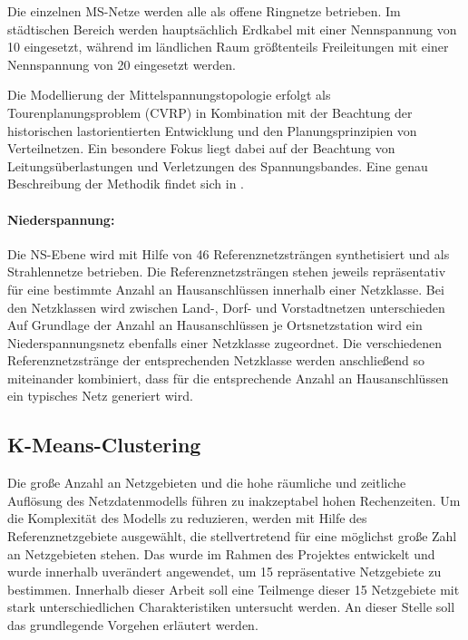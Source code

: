 Die einzelnen \gls{MS}-Netze werden alle als offene Ringnetze betrieben.
Im städtischen Bereich werden hauptsächlich Erdkabel mit einer Nennspannung von \SI{10}{\kv} eingesetzt, während im ländlichen Raum größtenteils Freileitungen mit einer Nennspannung von \SI{20}{\kv} eingesetzt werden. \cite{Mueller2019}\medskip

Die Modellierung der Mittelspannungstopologie erfolgt als Tourenplanungsproblem (\gls{CVRP}) in Kombination mit der Beachtung der historischen lastorientierten Entwicklung und den Planungsprinzipien von Verteilnetzen.
Ein besondere Fokus liegt dabei auf der Beachtung von Leitungsüberlastungen und Verletzungen des Spannungsbandes.
Eine genau Beschreibung der Methodik findet sich in \cite{Amme2018}.


\paragraph{Niederspannung:}

Die \gls{NS}-Ebene wird mit Hilfe von \num{46} Referenznetzsträngen synthetisiert und als Strahlennetze betrieben.
Die Referenznetzsträngen stehen jeweils repräsentativ für eine bestimmte Anzahl an Hausanschlüssen innerhalb einer Netzklasse.
Bei den Netzklassen wird zwischen Land-, Dorf- und Vorstadtnetzen unterschieden
Auf Grundlage der Anzahl an Hausanschlüssen je Ortsnetzstation wird ein Niederspannungsnetz ebenfalls einer Netzklasse zugeordnet.
Die verschiedenen Referenznetzstränge der entsprechenden Netzklasse werden anschließend so miteinander kombiniert, dass für die entsprechende Anzahl an Hausanschlüssen ein typisches Netz generiert wird. \cite{Mueller2019}


\subsection{K-Means-Clustering}

Die große Anzahl an Netzgebieten und die hohe räumliche und zeitliche Auflösung des Netzdatenmodells führen zu inakzeptabel hohen Rechenzeiten.
Um die Komplexität des Modells zu reduzieren, werden mit Hilfe des \kmeans Referenznetzgebiete ausgewählt, die stellvertretend für eine möglichst große Zahl an Netzgebieten stehen.
Das \kmean wurde im Rahmen des \openego Projektes \cite{Mueller2019} entwickelt und wurde innerhalb \cite{Schachler} uverändert angewendet, um \num{15} repräsentative Netzgebiete zu bestimmen.
Innerhalb dieser Arbeit soll eine Teilmenge dieser \num{15} Netzgebiete mit stark unterschiedlichen Charakteristiken untersucht werden.
An dieser Stelle soll das grundlegende Vorgehen erläutert werden. \medskip

